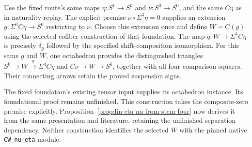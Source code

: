 \begin{proposition}
  \label{prop:lin-cw-fixed-cofiber}
  \notready
  Use the fixed route's same maps $\eta:S^1\to S^0$ and
  $\nu:S^3\to S^0$, and the same $C\eta$ as in naturality replay.
  The explicit premise $\nu\circ\Sigma^3\eta=0$ supplies an extension
  $g:\Sigma^3C\eta\to S^0$ restricting to $\nu$.
  Choose this extension once and define $W=C(g)$ using the selected
  cofiber construction of that foundation. The map
  $q:W\to\Sigma^4C\eta$ is precisely $\delta_g$ followed by the specified
  shift-composition isomorphism.
  For this same $g$ and $W$, one octahedron provides the distinguished
  triangles $S^0\to W\xrightarrow q\Sigma^4C\eta$ and
  $C\nu\to W\to S^6$, together with all four comparison squares.
  Their connecting arrows retain the proved suspension signs.

  The fixed foundation's existing tensor input supplies its octahedron
  instance. Its foundational proof remains unfinished. This construction
  takes the composite-zero premise explicitly. Proposition~\ref{prop:lin-eta-nu-from-stem-four}
  now derives it from the same presentation and literature, retaining the
  unfinished separation dependency. Neither construction identifies the
  selected $W$ with the pinned native \texttt{CW\_nu\_eta} module.
\end{proposition}

